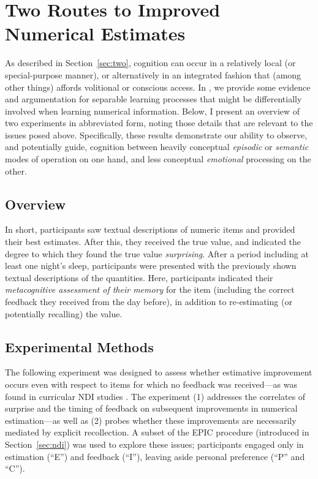 \graphicspath{{two-routes-estimation/}}

\chapter{Two Routes to Improved Numerical Estimates}
\label{chap:two}

As described in Section~\ref{sec:two}, cognition can occur in a relatively local
(or special-purpose manner), or alternatively in an integrated fashion that (among
other things) affords volitional or conscious access. In
\textcite{clark_known_2010}, we provide some evidence and argumentation
for separable learning processes that might be differentially involved when
learning numerical information. Below, I present an overview of two experiments
in abbreviated form, noting those details that are relevant to the issues
posed above. Specifically, these results demonstrate our ability to observe, and
potentially guide, cognition between heavily conceptual \emph{episodic} or
\emph{semantic} modes of operation on one hand, and less conceptual
\emph{emotional} processing on the other.

\section{Overview}

In short, participants saw textual descriptions of numeric items and provided
their best estimates. After this, they received the true value, and indicated
the degree to which they found the true value \emph{surprising}. After a period
including at least one night's sleep, participants were presented with the
previously shown textual descriptions of the quantities.  Here, participants
indicated their \emph{metacognitive assessment of their memory} for the item
(including the correct feedback they received from the day before), in addition to
re-estimating (or potentially recalling) the value.

\section{Experimental Methods}

The following experiment was designed to assess whether estimative improvement
occurs even with respect to items for which no feedback was received---as was
found in curricular NDI studies
\parencite[e.g.,][]{munnich_numerically-driven_2004,ranney_designing_2008}. The
experiment (1) addresses the correlates of surprise and the timing of feedback
on subsequent improvements in numerical estimation---as well as (2) probes
whether these improvements are necessarily mediated by explicit recollection. A
subset of the EPIC procedure (introduced in Section~\ref{sec:ndi}) was used to
explore these issues; participants engaged only in estimation (``E'') and
feedback (``I''), leaving aside personal preference (``P'' and ``C''). 

